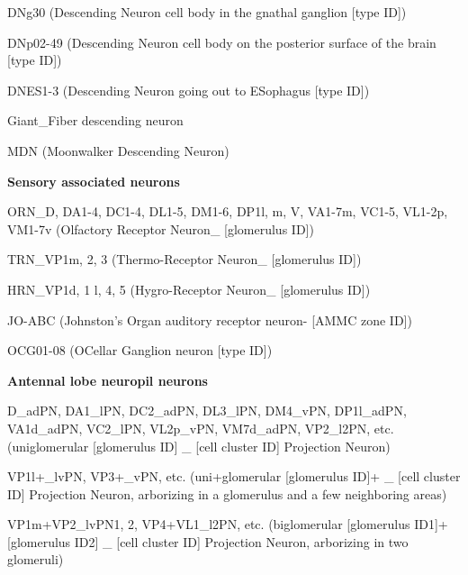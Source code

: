 \documentclass{article}
\begin{document}
{\footnotesize
\noindent\hspace*{1.0em}DNg30 (Descending Neuron cell body in the gnathal ganglion [type ID])\par
\noindent\hspace*{1.0em}DNp02-49 (Descending Neuron cell body on the posterior surface of the brain [type ID])\par
\noindent\hspace*{1.0em}DNES1-3 (Descending Neuron going out to ESophagus [type ID])\par
\noindent\hspace*{1.0em}Giant\_Fiber descending neuron\par
\noindent\hspace*{1.0em}MDN (Moonwalker Descending Neuron)\par
\noindent\textbf{Sensory associated neurons}\par
\noindent\hspace*{1.0em}ORN\_D, DA1-4, DC1-4, DL1-5, DM1-6, DP1l, m, V, VA1-7m, VC1-5, VL1-2p, VM1-7v (Olfactory Receptor Neuron\_ [glomerulus ID])\par
\noindent\hspace*{1.0em}TRN\_VP1m, 2, 3 (Thermo-Receptor Neuron\_ [glomerulus ID])\par
\noindent\hspace*{1.0em}HRN\_VP1d, 1 l, 4, 5 (Hygro-Receptor Neuron\_ [glomerulus ID])\par
\noindent\hspace*{1.0em}JO-ABC (Johnston’s Organ auditory receptor neuron- [AMMC zone ID])\par
\noindent\hspace*{1.0em}OCG01-08 (OCellar Ganglion neuron [type ID])\par
\noindent\textbf{Antennal lobe neuropil neurons}\par
\noindent\hspace*{1.0em}D\_adPN, DA1\_lPN, DC2\_adPN, DL3\_lPN, DM4\_vPN, DP1l\_adPN, VA1d\_adPN, VC2\_lPN, VL2p\_vPN, VM7d\_adPN, VP2\_l2PN, etc. (uniglomerular [glomerulus ID] \_ [cell cluster ID] Projection Neuron)\par
\noindent\hspace*{1.0em}VP1l+\_lvPN, VP3+\_vPN, etc. (uni+glomerular [glomerulus ID]+ \_ [cell cluster ID] Projection Neuron, arborizing in a glomerulus and a few neighboring areas)\par
\noindent\hspace*{1.0em}VP1m+VP2\_lvPN1, 2, VP4+VL1\_l2PN, etc. (biglomerular [glomerulus ID1]+[glomerulus ID2] \_ [cell cluster ID] Projection Neuron, arborizing in two glomeruli)\par
}
\end{document}
